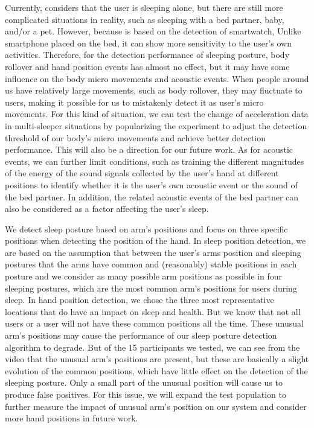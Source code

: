  Currently, {\systemname} considers that the user is sleeping alone, but
  there are still more complicated situations in reality, such as sleeping with a bed partner, baby, and/or a pet. However, because
  {\systemname} is based on the detection of smartwatch, Unlike smartphone placed on the bed, it can show more sensitivity to the user's
  own activities. Therefore, for the detection performance of sleeping posture, body rollover and hand position events has almost no
  effect, but it may have some influence on the body micro movements and acoustic events. When people around us have relatively large
  movements, such as body rollover, they may fluctuate to users, making it possible for us to mistakenly detect it as user's micro
  movements. For this kind of situation, we can test the change of acceleration data in multi-sleeper situations by popularizing the
  experiment to adjust the detection threshold of our body's micro movements and achieve better detection performance. This will also be
  a direction for our future work. As for acoustic events, we can further limit conditions, such as training the different magnitudes of
  the energy of the sound signals collected by the user's hand at different positions to identify whether it is the user's own acoustic
  event or the sound of the bed partner. In addition, the related acoustic events of the bed partner can also be considered as a factor
  affecting the user's sleep.

 We detect sleep posture based on arm's positions
  and focus on three specific positions when detecting the position of the hand. In sleep position detection, we are based on the
  assumption that between the user's arms position and sleeping postures that the arms have common and (reasonably) stable positions in
  each posture and we consider as many possible arm positions as possible in four sleeping postures, which are the most common arm's
  positions for users during sleep. In hand position detection, we chose the three most representative locations that do have an impact
  on sleep and health. But we know that not all users or a user will not have these common positions all the time. These unusual arm's
  positions may cause the performance of our sleep posture detection algorithm to degrade. But of the 15 participants we tested, we can
  see from the video that the unusual arm's positions are present, but these are basically a slight evolution of the common positions,
  which have little effect on the detection of the sleeping posture. Only a small part of the unusual position will cause us to produce
  false positives. For this issue, we will expand the test population to further measure the impact of unusual arm's position on our
  system and consider more hand positions in future work.


